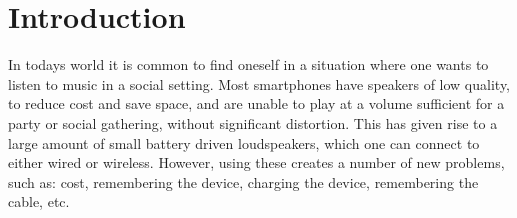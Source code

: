 \chapter{Introduction}\label{cha:introduction}
%
% 
%
%
%
%
%

In todays world it is common to find oneself in a situation where one wants to listen to music in a social setting.
Most smartphones have speakers of low quality, to reduce cost and save space, and are unable to play at a volume sufficient for a party or social gathering, without significant distortion.
This has given rise to a large amount of small battery driven loudspeakers, which one can connect to either wired or wireless.
However, using these creates a number of new problems, such as: cost, remembering the device, charging the device, remembering the cable, etc.


